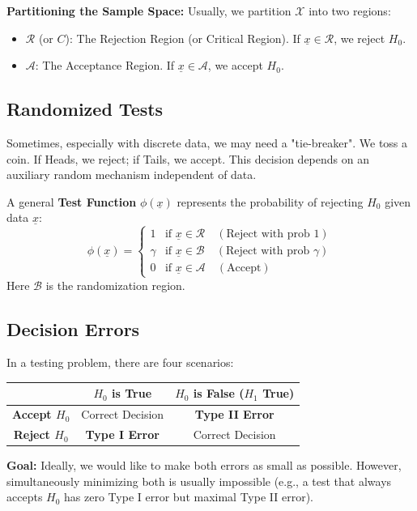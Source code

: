 \documentclass[12pt, a4paper]{article}
\theoremstyle{definition}
\newcommand{\xvec}{\underline{x}}
\begin{document}
\textbf{Partitioning the Sample Space:}
Usually, we partition $\mathcal{X}$ into two regions:
\begin{itemize}
    \item $\mathcal{R}$ (or $C$): The Rejection Region (or Critical Region). If $\xvec \in \mathcal{R}$, we reject $H_0$.
    \item $\mathcal{A}$: The Acceptance Region. If $\xvec \in \mathcal{A}$, we accept $H_0$.
\end{itemize}

\subsection{Randomized Tests}
Sometimes, especially with discrete data, we may need a "tie-breaker".
We toss a coin. If Heads, we reject; if Tails, we accept. This decision depends on an auxiliary random mechanism independent of data.

A general \textbf{Test Function} $\phi(\xvec)$ represents the probability of rejecting $H_0$ given data $\xvec$:
$$ 
\phi(\xvec) = 
\begin{cases} 
1 & \text{if } \xvec \in \mathcal{R} \quad (\text{Reject with prob 1}) \\
\gamma & \text{if } \xvec \in \mathcal{B} \quad (\text{Reject with prob } \gamma) \\
0 & \text{if } \xvec \in \mathcal{A} \quad (\text{Accept})
\end{cases}
$$
Here $\mathcal{B}$ is the randomization region.

\subsection{Decision Errors}

In a testing problem, there are four scenarios:

\begin{table}[h]
\centering
\begin{tabular}{|c|c|c|}
\hline
& \textbf{$H_0$ is True} & \textbf{$H_0$ is False ($H_1$ True)} \\
\hline
\textbf{Accept $H_0$} & Correct Decision & \textbf{Type II Error} \\
\hline
\textbf{Reject $H_0$} & \textbf{Type I Error} & Correct Decision \\
\hline
\end{tabular}
\end{table}

\textbf{Goal:} Ideally, we would like to make both errors as small as possible. However, simultaneously minimizing both is usually impossible (e.g., a test that always accepts $H_0$ has zero Type I error but maximal Type II error).
\end{document}
